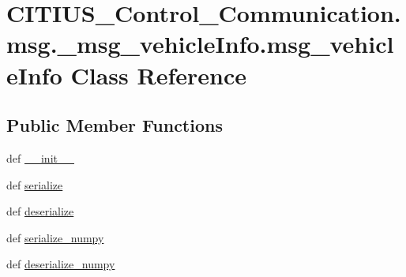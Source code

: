 \hypertarget{class_c_i_t_i_u_s___control___communication_1_1msg_1_1__msg__vehicle_info_1_1msg__vehicle_info}{\section{\-C\-I\-T\-I\-U\-S\-\_\-\-Control\-\_\-\-Communication.\-msg.\-\_\-msg\-\_\-vehicle\-Info.\-msg\-\_\-vehicle\-Info \-Class \-Reference}
\label{class_c_i_t_i_u_s___control___communication_1_1msg_1_1__msg__vehicle_info_1_1msg__vehicle_info}
}
\subsection*{\-Public \-Member \-Functions}
\begin{DoxyCompactItemize}
\item 
def \hyperlink{class_c_i_t_i_u_s___control___communication_1_1msg_1_1__msg__vehicle_info_1_1msg__vehicle_info_a53c7fdf76ae98394b1ab97b8b048f521}{\-\_\-\-\_\-init\-\_\-\-\_\-}
\item 
def \hyperlink{class_c_i_t_i_u_s___control___communication_1_1msg_1_1__msg__vehicle_info_1_1msg__vehicle_info_a92a3e056b187756ab825169eb7dca46e}{serialize}
\item 
def \hyperlink{class_c_i_t_i_u_s___control___communication_1_1msg_1_1__msg__vehicle_info_1_1msg__vehicle_info_af8a33a5b68dc0347c64091e3fa3c325f}{deserialize}
\item 
def \hyperlink{class_c_i_t_i_u_s___control___communication_1_1msg_1_1__msg__vehicle_info_1_1msg__vehicle_info_ad1b734fb1275a4a05623cce5cffea091}{serialize\-\_\-numpy}
\item 
def \hyperlink{class_c_i_t_i_u_s___control___communication_1_1msg_1_1__msg__vehicle_info_1_1msg__vehicle_info_a9ec7d1114e005a3dad623c5b814335e4}{deserialize\-\_\-numpy}
\end{DoxyCompactItemize}
